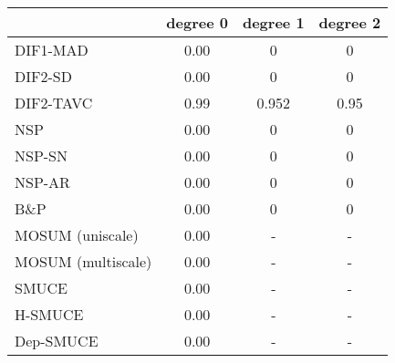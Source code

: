 \begin{tabular}{|l|c|c|c|}
  \hline
 & degree 0 & degree 1 & degree 2 \\ 
  \hline
DIF1-MAD & 0.00 & 0 & 0 \\ 
  DIF2-SD & 0.00 & 0 & 0 \\ 
  DIF2-TAVC & 0.99 & 0.952 & 0.95 \\ 
  NSP & 0.00 & 0 & 0 \\ 
  NSP-SN & 0.00 & 0 & 0 \\ 
  NSP-AR & 0.00 & 0 & 0 \\ 
  B\&P & 0.00 & 0 & 0 \\ 
  MOSUM (uniscale) & 0.00 & - & - \\ 
  MOSUM (multiscale) & 0.00 & - & - \\ 
  SMUCE & 0.00 & - & - \\ 
  H-SMUCE & 0.00 & - & - \\ 
  Dep-SMUCE & 0.00 & - & - \\ 
   \hline
\end{tabular}

